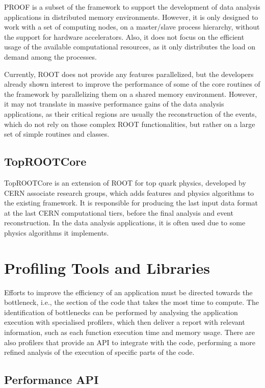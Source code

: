 PROOF is a subset of the framework to support the development of data analysis applications in distributed memory environments. However, it is only designed to work with a set of computing nodes, on a master/slave process hierarchy, without the support for hardware accelerators. Also, it does not focus on the efficient usage of the available computational resources, as it only distributes the load on demand among the processes.

Currently, ROOT does not provide any features parallelized, but the developers already shown interest to improve the performance of some of the core routines of the framework by parallelizing them on a shared memory environment. However, it may not translate in massive performance gains of the data analysis applications, as their critical regions are usually the reconstruction of the events, which do not rely on those complex ROOT functionalities, but rather on a large set of simple routines and classes.

\subsection*{TopROOTCore}

TopROOTCore is an extension of ROOT for top quark physics, developed by CERN associate research groups, which adds features and physics algorithms to the existing framework. It is responsible for producing the last input data format at the last CERN computational tiers, before the final analysis and event reconstruction. In the data analysis applications, it is often used due to some physics algorithms it implements.

\section{Profiling Tools and Libraries}
\label{tools}

Efforts to improve the efficiency of an application must be directed towards the bottleneck, i.e., the section of the code that takes the most time to compute. The identification of bottlenecks can be performed by analysing the application execution with specialised profilers, which then deliver a report with relevant information, such as each function execution time and memory usage. There are also profilers that provide an API to integrate with the code, performing a more refined analysis of the execution of specific parts of the code.

\subsection*{Performance API}

